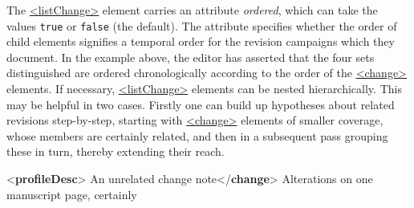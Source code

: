The \hyperref[TEI.listChange]{<listChange>} element carries an attribute {\itshape ordered}, which can take the values \texttt{true} or \texttt{false} (the default). The attribute specifies whether the order of child elements signifies a temporal order for the revision campaigns which they document. In the example above, the editor has asserted that the four sets distinguished are ordered chronologically according to the order of the \hyperref[TEI.change]{<change>} elements.  If necessary, \hyperref[TEI.listChange]{<listChange>} elements can be nested hierarchically. This may be helpful in two cases. Firstly one can build up hypotheses about related revisions step-by-step, starting with \hyperref[TEI.change]{<change>} elements of smaller coverage, whose members are certainly related, and then in a subsequent pass grouping these in turn, thereby extending their reach.\par\bgroup{}\exampleFont \begin{shaded}\noindent\mbox{}{<\textbf{profileDesc}>}\mbox{}\newline 
{}\mbox{}\newline 
\hspace*{1em}\mbox{}\newline 
\hspace*{1em}\hspace*{1em}An unrelated change note{</\textbf{change}>}\mbox{}\newline 
\hspace*{1em}\hspace*{1em}\mbox{}\newline 
\hspace*{1em}\hspace*{1em}\hspace*{1em}Alterations on one manuscript page, certainly\mbox{}\newline 

\end{shaded}
